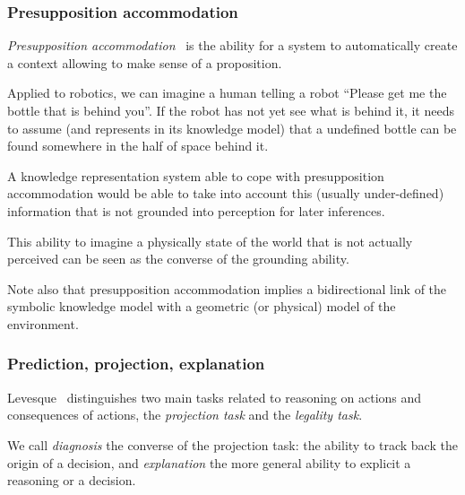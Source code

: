 \subsubsection{Presupposition accommodation}
\label{sect|presupposition-accommodation}

\emph{Presupposition accommodation}~\cite{VonFintel2008} is the ability for a
system to automatically create a context allowing to make sense of a
proposition.

Applied to robotics, we can imagine a human telling a robot ``Please get me the
bottle that is behind you''. If the robot has not yet see what is behind it, it
needs to assume (and represents in its knowledge model) that a undefined bottle
can be found somewhere in the half of space behind it.

A knowledge representation system able to cope with presupposition
accommodation would be able to take into account this (usually under-defined)
information that is not grounded into perception for later inferences.

This ability to imagine a physically state of the world that is not actually
perceived can be seen as the converse of the grounding ability.

Note also that presupposition accommodation implies a bidirectional link of the
symbolic knowledge model with a geometric (or physical) model of the
environment.

\subsubsection{Prediction, projection, explanation}
\label{sect|prediction-projection}

Levesque~\cite{Levesque2008} distinguishes two main tasks related to reasoning
on actions and consequences of actions, the \emph{projection task} and the
\emph{legality task}.

We call \emph{diagnosis} the converse of the projection task: the ability to
track back the origin of a decision, and \emph{explanation} the more general
ability to explicit a reasoning or a decision.

\begin{scriptsize}
\begin{center}
\end{center}
\end{scriptsize}


